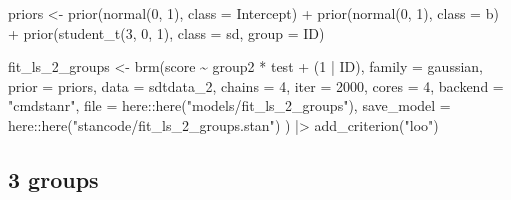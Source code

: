 \documentclass[
  man,floatsintext]{apa7}
\newenvironment{Shaded}{\begin{snugshade}}{\end{snugshade}}
\newcommand{\AttributeTok}[1]{\textcolor[rgb]{0.77,0.63,0.00}{#1}}
\newcommand{\DecValTok}[1]{\textcolor[rgb]{0.00,0.00,0.81}{#1}}
\newcommand{\FunctionTok}[1]{\textcolor[rgb]{0.00,0.00,0.00}{#1}}
\newcommand{\NormalTok}[1]{#1}
\newcommand{\OtherTok}[1]{\textcolor[rgb]{0.56,0.35,0.01}{#1}}
\newcommand{\SpecialCharTok}[1]{\textcolor[rgb]{0.00,0.00,0.00}{#1}}
\newcommand{\StringTok}[1]{\textcolor[rgb]{0.31,0.60,0.02}{#1}}
\begin{document}
\begin{Shaded}
\begin{Highlighting}[]
\NormalTok{priors }\OtherTok{\textless{}{-}} \FunctionTok{prior}\NormalTok{(}\FunctionTok{normal}\NormalTok{(}\DecValTok{0}\NormalTok{, }\DecValTok{1}\NormalTok{), }\AttributeTok{class =}\NormalTok{ Intercept) }\SpecialCharTok{+}
  \FunctionTok{prior}\NormalTok{(}\FunctionTok{normal}\NormalTok{(}\DecValTok{0}\NormalTok{, }\DecValTok{1}\NormalTok{), }\AttributeTok{class =}\NormalTok{ b) }\SpecialCharTok{+}
  \FunctionTok{prior}\NormalTok{(}\FunctionTok{student\_t}\NormalTok{(}\DecValTok{3}\NormalTok{, }\DecValTok{0}\NormalTok{, }\DecValTok{1}\NormalTok{), }\AttributeTok{class =}\NormalTok{ sd, }\AttributeTok{group =}\NormalTok{ ID) }

\NormalTok{fit\_ls\_2\_groups }\OtherTok{\textless{}{-}} \FunctionTok{brm}\NormalTok{(score }\SpecialCharTok{\textasciitilde{}}\NormalTok{ group2 }\SpecialCharTok{*}\NormalTok{ test }\SpecialCharTok{+}\NormalTok{ (}\DecValTok{1} \SpecialCharTok{|}\NormalTok{ ID),}
                      \AttributeTok{family =}\NormalTok{ gaussian,}
                      \AttributeTok{prior =}\NormalTok{ priors,}
                      \AttributeTok{data =}\NormalTok{ sdtdata\_2,}
                      \AttributeTok{chains =} \DecValTok{4}\NormalTok{, }\AttributeTok{iter =} \DecValTok{2000}\NormalTok{, }\AttributeTok{cores =} \DecValTok{4}\NormalTok{,}
                      \AttributeTok{backend =} \StringTok{"cmdstanr"}\NormalTok{,}
                      \AttributeTok{file =}\NormalTok{ here}\SpecialCharTok{::}\FunctionTok{here}\NormalTok{(}\StringTok{"models/fit\_ls\_2\_groups"}\NormalTok{),}
                      \AttributeTok{save\_model =}\NormalTok{ here}\SpecialCharTok{::}\FunctionTok{here}\NormalTok{(}\StringTok{"stancode/fit\_ls\_2\_groups.stan"}\NormalTok{)}
\NormalTok{                      ) }\SpecialCharTok{|\textgreater{}}
  \FunctionTok{add\_criterion}\NormalTok{(}\StringTok{"loo"}\NormalTok{)}
\end{Highlighting}
\end{Shaded}

\hypertarget{groups-1}{%
\subsection{3 groups}\label{groups-1}}
\end{document}
